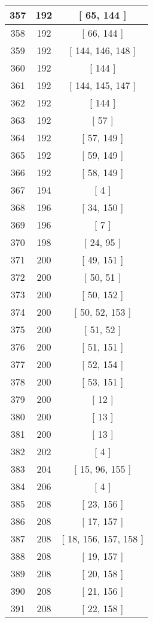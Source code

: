 \begin{center}
\begin{longtable}[H]{|| c c c ||}
\hline
357 & 192 & [ 65, 144 ] \\ 
\hline
358 & 192 & [ 66, 144 ] \\ 
\hline
359 & 192 & [ 144, 146, 148 ] \\ 
\hline
360 & 192 & [ 144 ] \\ 
\hline
361 & 192 & [ 144, 145, 147 ] \\ 
\hline
362 & 192 & [ 144 ] \\ 
\hline
363 & 192 & [ 57 ] \\ 
\hline
364 & 192 & [ 57, 149 ] \\ 
\hline
365 & 192 & [ 59, 149 ] \\ 
\hline
366 & 192 & [ 58, 149 ] \\ 
\hline
367 & 194 & [ 4 ] \\ 
\hline
368 & 196 & [ 34, 150 ] \\ 
\hline
369 & 196 & [ 7 ] \\ 
\hline
370 & 198 & [ 24, 95 ] \\ 
\hline
371 & 200 & [ 49, 151 ] \\ 
\hline
372 & 200 & [ 50, 51 ] \\ 
\hline
373 & 200 & [ 50, 152 ] \\ 
\hline
374 & 200 & [ 50, 52, 153 ] \\ 
\hline
375 & 200 & [ 51, 52 ] \\ 
\hline
376 & 200 & [ 51, 151 ] \\ 
\hline
377 & 200 & [ 52, 154 ] \\ 
\hline
378 & 200 & [ 53, 151 ] \\ 
\hline
379 & 200 & [ 12 ] \\ 
\hline
380 & 200 & [ 13 ] \\ 
\hline
381 & 200 & [ 13 ] \\ 
\hline
382 & 202 & [ 4 ] \\ 
\hline
383 & 204 & [ 15, 96, 155 ] \\ 
\hline
384 & 206 & [ 4 ] \\ 
\hline
385 & 208 & [ 23, 156 ] \\ 
\hline
386 & 208 & [ 17, 157 ] \\ 
\hline
387 & 208 & [ 18, 156, 157, 158 ] \\ 
\hline
388 & 208 & [ 19, 157 ] \\ 
\hline
389 & 208 & [ 20, 158 ] \\ 
\hline
390 & 208 & [ 21, 156 ] \\ 
\hline
391 & 208 & [ 22, 158 ] \\ 

\end{longtable}
\end{center}
